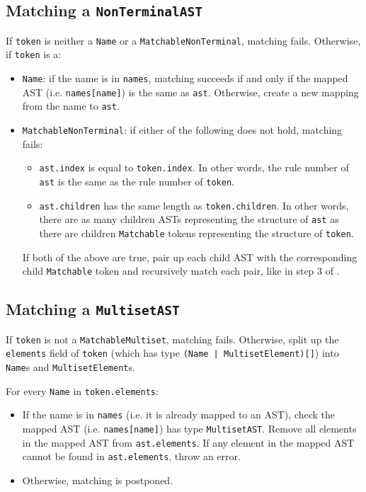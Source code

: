 \subsection{Matching a \texorpdfstring{\lstinline{NonTerminalAST}}{NonTerminalAST}}
If \lstinline{token} is neither a \lstinline{Name} or a \lstinline{MatchableNonTerminal}, matching fails. Otherwise, if \lstinline{token} is a:
\begin{itemize}
    \item \lstinline{Name}: if the name is in \lstinline{names}, matching succeeds if and only if the mapped AST (i.e. \lstinline{names[name]}) is the same as \lstinline{ast}. Otherwise, create a new mapping from the name to \lstinline{ast}.
    \item \lstinline{MatchableNonTerminal}: if either of the following does not hold, matching fails:
    \begin{itemize}
        \item \lstinline{ast.index} is equal to \lstinline{token.index}. In other words, the rule number of \lstinline{ast} is the same as the rule number of \lstinline{token}.
        \item \lstinline{ast.children} has the same length as \lstinline{token.children}. In other words, there are as many children ASTs representing the structure of \lstinline{ast} as there are children \lstinline{Matchable} tokens representing the structure of \lstinline{token}.
    \end{itemize}
    If both of the above are true, pair up each child AST with the corresponding child \lstinline{Matchable} token and recursively match each pair, like in step 3 of .
\end{itemize}
\subsection{Matching a \texorpdfstring{\lstinline{MultisetAST}}{MultisetAST}}
If \lstinline{token} is not a \lstinline{MatchableMultiset}, matching fails. Otherwise, split up the \lstinline{elements} field of \lstinline{token} (which has type \lstinline{(Name | MultisetElement)[]}) into \lstinline{Name}s and \lstinline{MultisetElement}s.

For every \lstinline{Name} in \lstinline{token.elements}:
\begin{itemize}
    \item If the name is in \lstinline{names} (i.e. it is already mapped to an AST), check the mapped AST (i.e. \lstinline{names[name]}) has type \lstinline{MultisetAST}. Remove all elements in the mapped AST from \lstinline{ast.elements}. If any element in the mapped AST cannot be found in \lstinline{ast.elements}, throw an error.
    \item Otherwise, matching is postponed.

\end{itemize}

